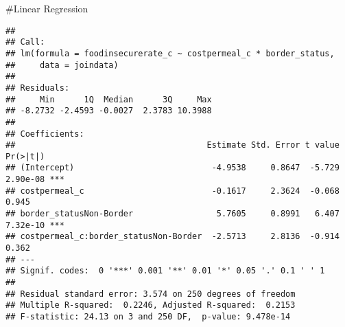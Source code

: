 \documentclass[]{article}
\newenvironment{Shaded}{\begin{snugshade}}{\end{snugshade}}
\newcommand{\CommentTok}[1]{\textcolor[rgb]{0.56,0.35,0.01}{\textit{#1}}}
\newcommand{\DataTypeTok}[1]{\textcolor[rgb]{0.13,0.29,0.53}{#1}}
\newcommand{\KeywordTok}[1]{\textcolor[rgb]{0.13,0.29,0.53}{\textbf{#1}}}
\newcommand{\NormalTok}[1]{#1}
\newcommand{\OperatorTok}[1]{\textcolor[rgb]{0.81,0.36,0.00}{\textbf{#1}}}
\newcommand{\StringTok}[1]{\textcolor[rgb]{0.31,0.60,0.02}{#1}}
\begin{document}
\#Linear Regression

\begin{Shaded}
\end{Shaded}

\begin{verbatim}
## 
## Call:
## lm(formula = foodinsecurerate_c ~ costpermeal_c * border_status, 
##     data = joindata)
## 
## Residuals:
##     Min      1Q  Median      3Q     Max 
## -8.2732 -2.4593 -0.0027  2.3783 10.3988 
## 
## Coefficients:
##                                       Estimate Std. Error t value Pr(>|t|)    
## (Intercept)                            -4.9538     0.8647  -5.729 2.90e-08 ***
## costpermeal_c                          -0.1617     2.3624  -0.068    0.945    
## border_statusNon-Border                 5.7605     0.8991   6.407 7.32e-10 ***
## costpermeal_c:border_statusNon-Border  -2.5713     2.8136  -0.914    0.362    
## ---
## Signif. codes:  0 '***' 0.001 '**' 0.01 '*' 0.05 '.' 0.1 ' ' 1
## 
## Residual standard error: 3.574 on 250 degrees of freedom
## Multiple R-squared:  0.2246, Adjusted R-squared:  0.2153 
## F-statistic: 24.13 on 3 and 250 DF,  p-value: 9.478e-14
\end{verbatim}

\begin{Shaded}
\end{Shaded}
\end{document}
